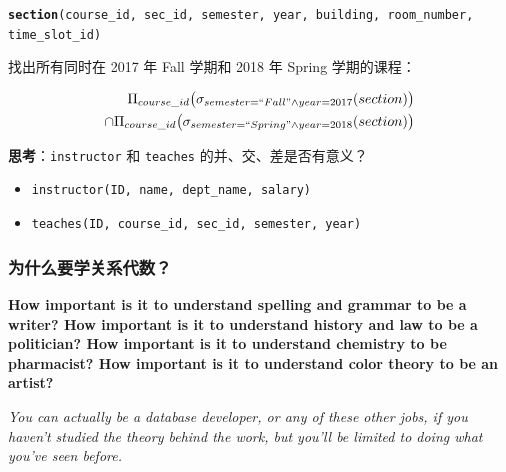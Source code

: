 \documentclass[aspectratio=169, 14pt]{beamer}
\begin{document}
\begin{frame}
    \texttt{\textbf{section}(course\_id, sec\_id, semester, year, building, room\_number, time\_slot\_id)}
    
        找出所有同时在 2017 年 Fall 学期和 2018 年 Spring 学期的课程：
        
        \begin{equation*}
            \begin{split}
                \Pi_{course\_id}\bigl(\sigma_{semester=``Fall" \land year=2017}(section)\bigr) \\ \cap
                \Pi_{course\_id}\bigl(\sigma_{semester=``Spring" \land year=2018}(section)\bigr)
            \end{split}
        \end{equation*}
    
\end{frame}

\begin{frame}

    {\large {}} \textbf{思考}：\texttt{instructor} 和 \texttt{teaches} 的并、交、差是否有意义？ 

    \begin{itemize}
        \item \texttt{instructor(ID, name, dept\_name, salary)}
        \item \texttt{teaches(ID, course\_id, sec\_id, semester, year)}
    \end{itemize}  
\pause
{} 
\end{frame}

\begin{frame}
    \frametitle{为什么要学关系代数？}    
    \textbf{How important is it to understand spelling and grammar to be a writer? How important is it to understand history and law to be a politician? How important is it to understand chemistry to be pharmacist? How important is it to understand color theory to be an artist?}

    \emph{You can actually be a database developer, or any of these other jobs, if you haven't studied the theory behind the work, but you'll be limited to doing what you've seen before.}

\end{frame}
\end{document}
